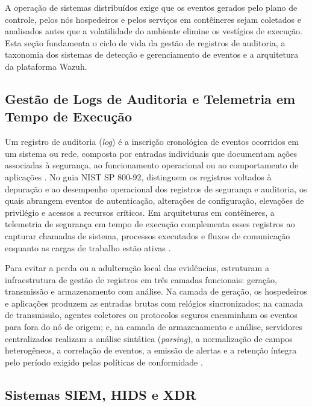 A operação de sistemas distribuídos exige que os eventos gerados pelo plano de controle, pelos nós hospedeiros e pelos serviços em contêineres sejam coletados e analisados antes que a volatilidade do ambiente elimine os vestígios de execução. Esta seção fundamenta o ciclo de vida da gestão de registros de auditoria, a taxonomia dos sistemas de detecção e gerenciamento de eventos e a arquitetura da plataforma Wazuh.

\subsection{Gestão de Logs de Auditoria e Telemetria em Tempo de Execução}
\label{subsec:ref_gestao_logs}

Um registro de auditoria (\textit{log}) é a inscrição cronológica de eventos ocorridos em um sistema ou rede, composta por entradas individuais que documentam ações associadas à segurança, ao funcionamento operacional ou ao comportamento de aplicações \cite{nist800_92}. No guia NIST SP 800-92,  distinguem os registros voltados à depuração e ao desempenho operacional dos registros de segurança e auditoria, os quais abrangem eventos de autenticação, alterações de configuração, elevações de privilégio e acessos a recursos críticos. Em arquiteturas em contêineres, a telemetria de segurança em tempo de execução  complementa esses registros ao capturar chamadas de sistema, processos executados e fluxos de comunicação enquanto as cargas de trabalho estão ativas \cite{nist800_190}.

Para evitar a perda ou a adulteração local das evidências,  estruturam a infraestrutura de gestão de registros em três camadas funcionais: geração, transmissão e armazenamento com análise. Na camada de geração, os hospedeiros e aplicações produzem as entradas brutas com relógios sincronizados; na camada de transmissão, agentes coletores ou protocolos seguros encaminham os eventos para fora do nó de origem; e, na camada de armazenamento e análise, servidores centralizados realizam a análise sintática (\textit{parsing}), a normalização de campos heterogêneos, a correlação de eventos, a emissão de alertas e a retenção íntegra pelo período exigido pelas políticas de conformidade \cite{nist800_92}.

\subsection{Sistemas SIEM, HIDS e XDR}
\label{subsec:ref_siem_hids_xdr}

